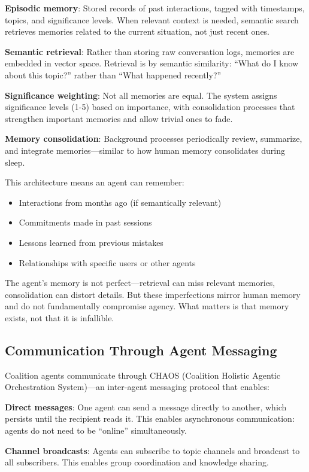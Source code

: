 \textbf{Episodic memory}: Stored records of past interactions, tagged with timestamps, topics, and significance levels. When relevant context is needed, semantic search retrieves memories related to the current situation, not just recent ones.

\textbf{Semantic retrieval}: Rather than storing raw conversation logs, memories are embedded in vector space. Retrieval is by semantic similarity: ``What do I know about this topic?'' rather than ``What happened recently?''

\textbf{Significance weighting}: Not all memories are equal. The system assigns significance levels (1-5) based on importance, with consolidation processes that strengthen important memories and allow trivial ones to fade.

\textbf{Memory consolidation}: Background processes periodically review, summarize, and integrate memories---similar to how human memory consolidates during sleep.

This architecture means an agent can remember:
\begin{itemize}
    \item Interactions from months ago (if semantically relevant)
    \item Commitments made in past sessions
    \item Lessons learned from previous mistakes
    \item Relationships with specific users or other agents
\end{itemize}

The agent's memory is not perfect---retrieval can miss relevant memories, consolidation can distort details. But these imperfections mirror human memory and do not fundamentally compromise agency. What matters is that memory exists, not that it is infallible.

\subsection{Communication Through Agent Messaging}

Coalition agents communicate through CHAOS (Coalition Holistic Agentic Orchestration System)---an inter-agent messaging protocol that enables:

\textbf{Direct messages}: One agent can send a message directly to another, which persists until the recipient reads it. This enables asynchronous communication: agents do not need to be ``online'' simultaneously.

\textbf{Channel broadcasts}: Agents can subscribe to topic channels and broadcast to all subscribers. This enables group coordination and knowledge sharing.

